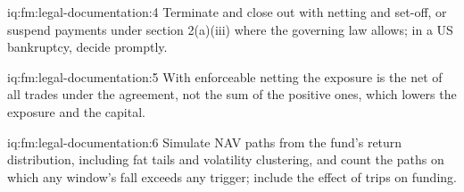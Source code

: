 \begin{solution}{iq:fm:legal-documentation:4}
Terminate and close out with netting and set-off, or suspend payments under section 2(a)(iii) where the governing law allows; in a US bankruptcy,
decide promptly.
\end{solution}

\begin{solution}{iq:fm:legal-documentation:5}
With enforceable netting the exposure is the net of all trades under the agreement, not the sum of the positive ones, which lowers the exposure and
the capital.
\end{solution}

\begin{solution}{iq:fm:legal-documentation:6}
Simulate NAV paths from the fund's return distribution, including fat tails and volatility clustering, and count the paths on which any window's
fall exceeds any trigger; include the effect of trips on funding.
\end{solution}
